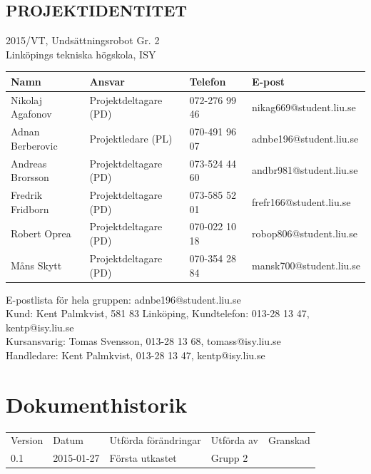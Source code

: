 \documentclass[11pt]{article}
\begin{document}
\pagebreak
\begin{center}

\section*{PROJEKTIDENTITET}
2015/VT, Undsättningsrobot Gr. 2
\\
Linköpings tekniska högskola, ISY
\\[0.5in]
\begin{table}[h]
\begin{tabular}{|l|l|l|l|} \hline
Namn & Ansvar & Telefon & E-post \\[0.1in] \hline
Nikolaj Agafonov & Projektdeltagare (PD) & 072-276 99 46 & nikag669@student.liu.se \\ \hline
Adnan Berberovic & Projektledare (PL) & 070-491 96 07 & adnbe196@student.liu.se \\ \hline
Andreas Brorsson & Projektdeltagare (PD) & 073-524 44 60 & andbr981@student.liu.se \\ \hline
Fredrik Fridborn & Projektdeltagare (PD) & 073-585 52 01 & frefr166@student.liu.se \\ \hline
Robert Oprea & Projektdeltagare (PD) & 070-022 10 18 & robop806@student.liu.se \\ \hline
Måns Skytt & Projektdeltagare (PD) & 070-354 28 84 & mansk700@student.liu.se \\ \hline
\end{tabular}
\end{table}

E-postlista för hela gruppen: adnbe196@student.liu.se
\\[1in]
Kund: Kent Palmkvist, 581 83 Linköping,
Kundtelefon: 013-28 13 47, kentp@isy.liu.se
\\[1in]
Kursansvarig: Tomas Svensson, 013-28 13 68, tomass@isy.liu.se
\\
Handledare: Kent Palmkvist, 013-28 13 47, kentp@isy.liu.se
\end{center}
\pagebreak

\tableofcontents

\pagebreak

\section*{Dokumenthistorik}
\begin{table}[h]
\begin{tabular}{lllll}

Version & Datum & Utförda förändringar & Utförda av & Granskad \\[0.1in]
0.1 & 2015-01-27 & Första utkastet & Grupp 2 &

\end{tabular}
\end{table}
\end{document}
